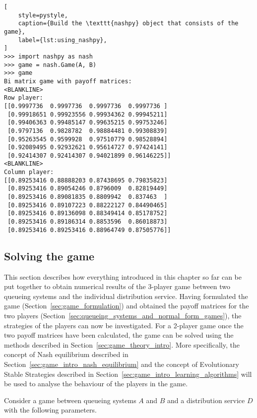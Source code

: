 \begin{lstlisting}[
    style=pystyle,
    caption={Build the \texttt{nashpy} object that consists of the game},
    label={lst:using_nashpy},
]
>>> import nashpy as nash
>>> game = nash.Game(A, B)
>>> game
Bi matrix game with payoff matrices:
<BLANKLINE>
Row player:
[[0.9997736  0.9997736  0.9997736  0.9997736 ]
 [0.99918651 0.99923556 0.99934362 0.99945211]
 [0.99406363 0.99485147 0.99635215 0.99753246]
 [0.9797136  0.9828782  0.98884481 0.99308839]
 [0.95263545 0.9599928  0.97510779 0.98528894]
 [0.92089495 0.92932621 0.95614727 0.97424141]
 [0.92414307 0.92414307 0.94021899 0.96146225]]
<BLANKLINE>
Column player:
[[0.89253416 0.88888203 0.87438695 0.79835823]
 [0.89253416 0.89054246 0.8796009  0.82819449]
 [0.89253416 0.89081835 0.8809942  0.837463  ]
 [0.89253416 0.89107223 0.88222127 0.84490465]
 [0.89253416 0.89136098 0.88349414 0.85178752]
 [0.89253416 0.89186314 0.8853596  0.86018873]
 [0.89253416 0.89253416 0.88964749 0.87505776]]

\end{lstlisting}



\subsection{Solving the game}\label{sec:game_solving}

This section describes how everything introduced in this chapter so far can be
put together to obtain numerical results of the 3-player game between two
queueing systems and the individual distribution service.
Having formulated the game (Section~\ref{sec:game_formulation}) and obtained
the payoff matrices for the two players
(Section~\ref{sec:queueing_systems_and_normal_form_games}), the strategies of
the players can now be investigated.
For a 2-player game once the two payoff matrices have been calculated,
the game can be solved using the methods described in
Section~\ref{sec:game_theory_intro}.
More specifically, the concept of Nash equilibrium described in
Section~\ref{sec:game_intro_nash_equilibrium} and the concept of Evolutionary
Stable Strategies described in Section~\ref{sec:game_intro_learning_algorithms}
will be used to analyse the behaviour of the players in the game.

Consider a game between queueing systems \(A\) and \(B\) and a distribution
service \(D\) with the following parameters.

